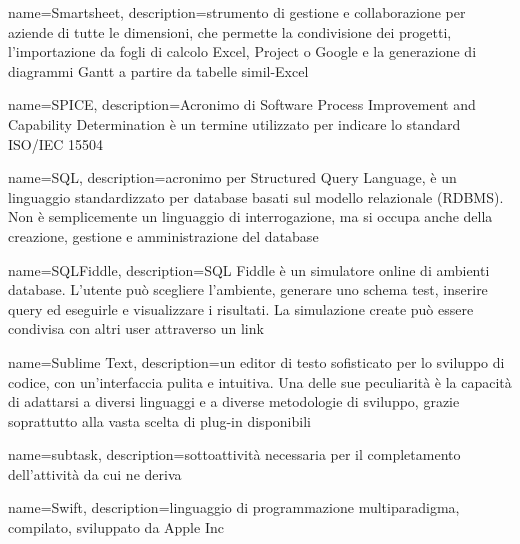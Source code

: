 {
	name=Smartsheet,
	description={strumento di gestione e collaborazione per aziende di tutte le dimensioni, che permette la condivisione dei progetti, l'importazione da fogli di calcolo Excel, Project o Google e la generazione di diagrammi Gantt a partire da tabelle simil-Excel}
}

{
	name=SPICE,
	description={Acronimo di Software Process Improvement and Capability Determination è un termine utilizzato per indicare lo standard ISO/IEC 15504}
}

{
	name=SQL,
	description={acronimo per Structured Query Language, è un linguaggio standardizzato per database basati sul modello relazionale (RDBMS). Non è semplicemente un linguaggio di interrogazione, ma si occupa anche della creazione, gestione e amministrazione del database}
}

{
	name=SQLFiddle,
	description={SQL Fiddle è un simulatore online di ambienti database. L'utente può scegliere l'ambiente, generare uno schema test, inserire query ed eseguirle e visualizzare i risultati. La simulazione create può essere condivisa con altri user attraverso un link}
}

{
	name=Sublime Text,
	description={un editor di testo sofisticato per lo sviluppo di codice, con un'interfaccia pulita e intuitiva. Una delle sue peculiarit\`{a} \`{e} la capacità di adattarsi a diversi linguaggi e a diverse metodologie di sviluppo, grazie soprattutto alla vasta scelta di plug-in disponibili}
}

{
	name=subtask,
	description={sottoattività necessaria per il completamento dell'attività da cui ne deriva}
}

{
	name=Swift,
	description={linguaggio di programmazione multiparadigma, compilato, sviluppato da Apple Inc}
}
